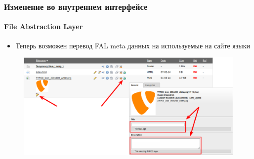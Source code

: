
\begin{frame}[fragile]
	\frametitle{Изменение во внутреннем интерфейсе}
	\framesubtitle{File Abstraction Layer}

	\begin{itemize}
		\item Теперь возможен перевод FAL meta данных на используемые на сайте языки
	\end{itemize}

	\begin{figure}
		\includegraphics[width=0.95\linewidth]{Images/BackendChanges/FalTranslateMetaData.png}
	\end{figure}

\end{frame}


